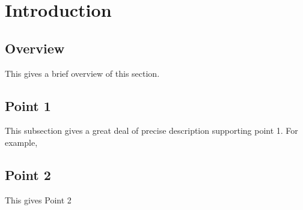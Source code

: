 \section{Introduction}
\label{sec:Introduction}

\subsection{Overview} 
This gives a brief overview of this section.

\subsection{Point 1}
This subsection gives a great deal of precise description supporting point 1.  For example,

\subsection{Point 2}
This gives Point 2
